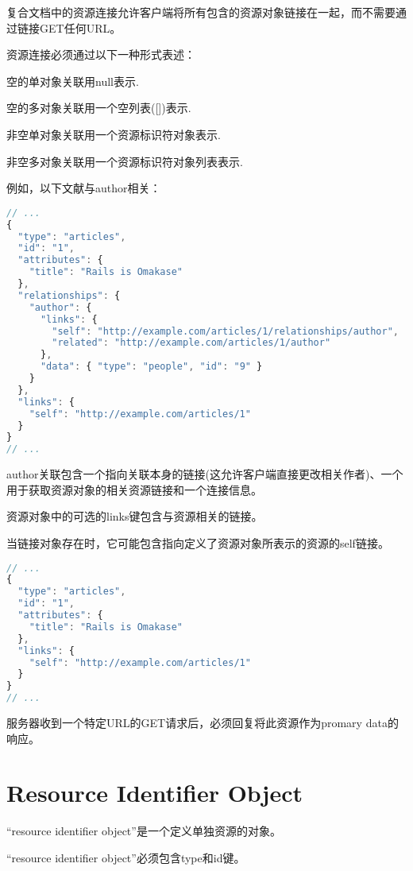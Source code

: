 复合文档中的资源连接允许客户端将所有包含的资源对象链接在一起，而不需要通过链接GET任何URL。

资源连接必须通过以下一种形式表述：

\begin{compactitem}
\item 空的单对象关联用null表示.
\item 空的多对象关联用一个空列表([])表示.
\item 非空单对象关联用一个资源标识符对象表示.
\item 非空多对象关联用一个资源标识符对象列表表示.
\end{compactitem}

例如，以下文献与author相关：

\begin{lstlisting}[language=JavaScript]
// ...
{
  "type": "articles",
  "id": "1",
  "attributes": {
    "title": "Rails is Omakase"
  },
  "relationships": {
    "author": {
      "links": {
        "self": "http://example.com/articles/1/relationships/author",
        "related": "http://example.com/articles/1/author"
      },
      "data": { "type": "people", "id": "9" }
    }
  },
  "links": {
    "self": "http://example.com/articles/1"
  }
}
// ...
\end{lstlisting}


author关联包含一个指向关联本身的链接(这允许客户端直接更改相关作者)、一个用于获取资源对象的相关资源链接和一个连接信息。

资源对象中的可选的links键包含与资源相关的链接。

当链接对象存在时，它可能包含指向定义了资源对象所表示的资源的self链接。


\begin{lstlisting}[language=JavaScript]
// ...
{
  "type": "articles",
  "id": "1",
  "attributes": {
    "title": "Rails is Omakase"
  },
  "links": {
    "self": "http://example.com/articles/1"
  }
}
// ...
\end{lstlisting}


服务器收到一个特定URL的GET请求后，必须回复将此资源作为promary data的响应。


\section{Resource Identifier Object}

“resource identifier object”是一个定义单独资源的对象。

“resource identifier object”必须包含type和id键。


